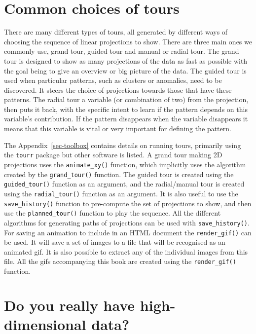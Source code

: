 \documentclass[
  letterpaper,
]{krantz}
\begin{document}
\section{Common choices of tours}\label{common-choices-of-tours}

There are many different types of tours, all generated by different ways
of choosing the sequence of linear projections to show. There are three
main ones we commonly use, grand tour, guided tour and manual or radial
tour. The grand tour is designed to show as many projections of the data
as fast as possible with the goal being to give an overview or big
picture of the data. The guided tour is used when particular patterns,
such as clusters or anomalies, need to be discovered. It steers the
choice of projections towards those that have these patterns. The radial
tour a variable (or combination of two) from the projection, then puts
it back, with the specific intent to learn if the pattern depends on
this variable's contribution. If the pattern disappears when the
variable disappears it means that this variable is vital or very
important for defining the pattern.

The Appendix~\ref{sec-toolbox} contains details on running tours,
primarily using the \texttt{tourr} package but other software is listed.
A grand tour making 2D projections uses the \texttt{animate\_xy()}
function, which implicitly uses the algorithm created by the
\texttt{grand\_tour()} function. The guided tour is created using the
\texttt{guided\_tour()} function as an argument, and the radial/manual
tour is created using the \texttt{radial\_tour()} function as an
argument. It is also useful to use the \texttt{save\_history()} function
to pre-compute the set of projections to show, and then use the
\texttt{planned\_tour()} function to play the sequence. All the
different algorithms for generating paths of projections can be used
with \texttt{save\_history()}. For saving an animation to include in an
HTML document the \texttt{render\_gif()} can be used. It will save a set
of images to a file that will be recognised as an animated gif. It is
also possible to extract any of the individual images from this file.
All the gifs accompanying this book are created using the
\texttt{render\_gif()} function.

\section{Do you really have high-dimensional
data?}\label{do-you-really-have-high-dimensional-data}
\end{document}
